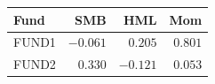 \begin{tabular}{lrrr}
\toprule
Fund & SMB & HML & Mom \\
\midrule
FUND1 & $-0.061$ & $0.205$ & $0.801$ \\
FUND2 & $0.330$ & $-0.121$ & $0.053$ \\
\bottomrule
\end{tabular}

